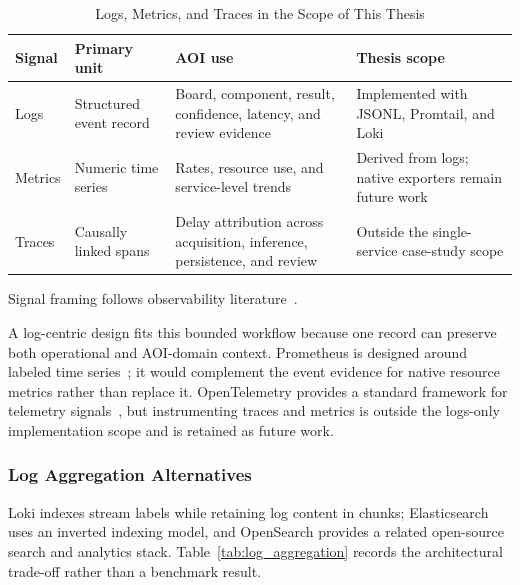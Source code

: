 \documentclass[12pt,a4paper]{article}
\begin{document}
\begin{table}[!ht]
\centering
\small
\caption{Logs, Metrics, and Traces in the Scope of This Thesis}
\label{tab:three_pillars}
\begin{tabular}{p{} p{} p{} p{}}
\toprule
\textbf{Signal} & \textbf{Primary unit} & \textbf{AOI use} & \textbf{Thesis scope} \\
\midrule
Logs & Structured event record & Board, component, result, confidence, latency, and review evidence & Implemented with JSONL, Promtail, and Loki \\
Metrics & Numeric time series & Rates, resource use, and service-level trends & Derived from logs; native exporters remain future work \\
Traces & Causally linked spans & Delay attribution across acquisition, inference, persistence, and review & Outside the single-service case-study scope \\
\bottomrule
\end{tabular}

\vspace{0.3em}
\raggedright\footnotesize Signal framing follows observability literature~\cite{majors2022observability,sridharan2018distributed}.
\end{table}

A log-centric design fits this bounded workflow because one record can preserve
both operational and AOI-domain context. Prometheus is designed around labeled
time series~\cite{prometheus}; it would complement the event evidence for native
resource metrics rather than replace it. OpenTelemetry provides a standard
framework for telemetry signals~\cite{opentelemetry}, but instrumenting traces
and metrics is outside the logs-only implementation scope and is retained as
future work.

\subsubsection{Log Aggregation Alternatives}
Loki indexes stream labels while retaining log content in chunks; Elasticsearch
uses an inverted indexing model, and OpenSearch provides a related open-source
search and analytics stack. Table~\ref{tab:log_aggregation} records the
architectural trade-off rather than a benchmark result.
\end{document}
